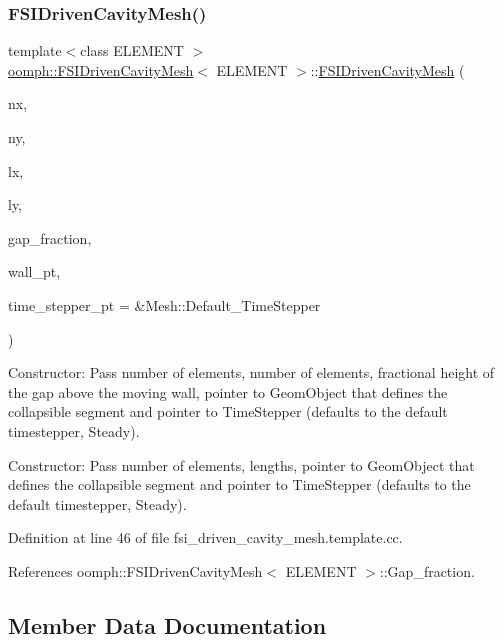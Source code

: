 \subsubsection{\texorpdfstring{F\+S\+I\+Driven\+Cavity\+Mesh()}{FSIDrivenCavityMesh()}}
{\footnotesize\ttfamily template$<$class E\+L\+E\+M\+E\+NT $>$ \\
\hyperlink{classoomph_1_1FSIDrivenCavityMesh}{oomph\+::\+F\+S\+I\+Driven\+Cavity\+Mesh}$<$ E\+L\+E\+M\+E\+NT $>$\+::\hyperlink{classoomph_1_1FSIDrivenCavityMesh}{F\+S\+I\+Driven\+Cavity\+Mesh} (\begin{DoxyParamCaption}\item[{const unsigned \&}]{nx,  }\item[{const unsigned \&}]{ny,  }\item[{const double \&}]{lx,  }\item[{const double \&}]{ly,  }\item[{const double \&}]{gap\+\_\+fraction,  }\item[{Geom\+Object $\ast$}]{wall\+\_\+pt,  }\item[{Time\+Stepper $\ast$}]{time\+\_\+stepper\+\_\+pt = {\ttfamily \&Mesh\+:\+:Default\+\_\+TimeStepper} }\end{DoxyParamCaption})}



Constructor\+: Pass number of elements, number of elements, fractional height of the gap above the moving wall, pointer to Geom\+Object that defines the collapsible segment and pointer to Time\+Stepper (defaults to the default timestepper, Steady). 

Constructor\+: Pass number of elements, lengths, pointer to Geom\+Object that defines the collapsible segment and pointer to Time\+Stepper (defaults to the default timestepper, Steady). 

Definition at line 46 of file fsi\+\_\+driven\+\_\+cavity\+\_\+mesh.\+template.\+cc.



References oomph\+::\+F\+S\+I\+Driven\+Cavity\+Mesh$<$ E\+L\+E\+M\+E\+N\+T $>$\+::\+Gap\+\_\+fraction.



\subsection{Member Data Documentation}
\mbox{\label{classoomph_1_1FSIDrivenCavityMesh_ad95b3650cfa765b1ac6a0f131d407b23}} 

